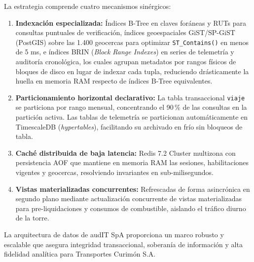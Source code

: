 La estrategia comprende cuatro mecanismos sinérgicos:
\begin{enumerate}
  \item \textbf{Indexación especializada:} Índices B-Tree en claves foráneas y RUTs para consultas puntuales de verificación, índices geoespaciales GiST/SP-GiST (PostGIS) sobre las 1.400 geocercas para optimizar \texttt{ST\_Contains()} en menos de 5 ms, e índices BRIN (\textit{Block Range Indexes}) en series de telemetría y auditoría cronológica, los cuales agrupan metadatos por rangos físicos de bloques de disco en lugar de indexar cada tupla, reduciendo drásticamente la huella en memoria RAM respecto de índices B-Tree equivalentes.
  \item \textbf{Particionamiento horizontal declarativo:} La tabla transaccional \texttt{viaje} se particiona por rango mensual, concentrando el 90\,\% de las consultas en la partición activa. Las tablas de telemetría se particionan automáticamente en TimescaleDB (\textit{hypertables}), facilitando su archivado en frío sin bloqueos de tabla.
  \item \textbf{Caché distribuida de baja latencia:} Redis 7.2 Cluster multizona con persistencia AOF que mantiene en memoria RAM las sesiones, habilitaciones vigentes y geocercas, resolviendo invariantes en sub-milisegundos.
  \item \textbf{Vistas materializadas concurrentes:} Refrescadas de forma asincrónica en segundo plano mediante actualización concurrente de vistas materializadas para pre-liquidaciones y consumos de combustible, aislando el tráfico diurno de la torre.
\end{enumerate}

La arquitectura de datos de audIT SpA proporciona un marco robusto y escalable que asegura integridad transaccional, soberanía de información y alta fidelidad analítica para Transportes Curimón S.A.


